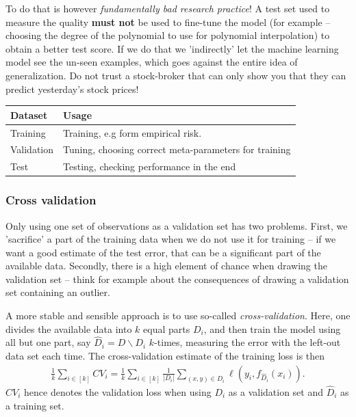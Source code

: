 \documentclass{article}
\newcommand{\abs}[1]{\vert #1 \vert}
\begin{document}
To do that is however \emph{fundamentally bad research practice}! A test set used to measure the quality \textbf{must not} be used to fine-tune the model (for example -- choosing the degree of the polynomial to use for polynomial interpolation) to obtain a better test score. If we do that we 'indirectly' let the machine learning model see the un-seen examples, which goes against the entire idea of generalization. Do not trust a stock-broker that can only show you that they can predict yesterday's stock prices!

\begin{center}
    \begin{tabular}{|l|l|}
         \hline Dataset & Usage   \\
            \hline Training  & Training, e.g form empirical risk. \\
            Validation  & Tuning, choosing correct meta-parameters for training \\
            Test & Testing, checking performance in the end \\
            \hline
    \end{tabular}
\end{center}

\subsubsection{Cross validation} Only using one set of observations as a validation set has two problems. First, we 'sacrifice' a part of the training data when we do not use it for training -- if we want a good estimate of the test error, that can be a significant part of the available data. Secondly, there is a high element of chance when drawing the validation set -- think for example about the consequences of drawing a validation set containing an outlier.

A more stable and sensible approach is to use so-called \emph{cross-validation}. Here, one divides the available data into $k$ equal parts $D_i$, and then train the model using all but one part, say $\hat{D}_{i} = D \backslash D_i$ $k$-times, measuring the error with the left-out data set each time. The cross-validation estimate of the training loss is then
\begin{align*}
    \frac{1}{k} \sum_{i\in [k]} CV_i = \frac{1}{k}\sum_{i \in [k]} \frac{1}{\abs{D_i}} \sum_{(x,y) \in D_i} \ell(y_i, f_{\widehat{D}_i}(x_i)).
\end{align*}
$CV_i$ hence denotes the validation loss when using $D_i$ as a validation set and $\hat{D}_{i}$ as a training set. 
\end{document}
